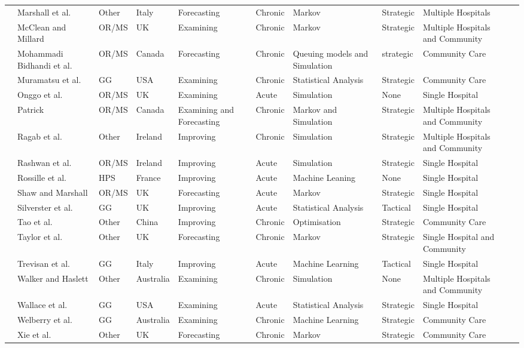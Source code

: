 \documentclass[thesis.tex]{subfiles}
\begin{document}
\begin{landscape}
\begin{table}[]
{\begin{tabular}{@{}llllllllll@{}}
   \cite{Marshall3} &Marshall et al.&Other& Italy &Forecasting&Chronic&Markov&Strategic&Multiple Hospitals\\
  \cite{McClean} &McClean and Millard& OR/MS& UK &Examining&Chronic&Markov&Strategic&Multiple Hospitals and Community\\
\cite{Bidhandi} & Mohammadi Bidhandi et al.&OR/MS&Canada&Forecasting&Chronic&Queuing models and Simulation&strategic&Community Care\\
   \cite{Muramatsu} &Muramatsu et al.&GG&USA& Examining&Chronic&Statistical Analysis&Strategic&Community Care\\
  \cite{Onggo} &Onggo et al.&OR/MS&UK&Examining&Acute&Simulation&None&Single Hospital\\   
  \cite{Patrick}  &Patrick&OR/MS&Canada&Examining and Forecasting&Chronic&Markov and Simulation&Strategic&Multiple Hospitals and Community\\
  \cite{Ragab}  &Ragab et al.& Other&Ireland&Improving&Chronic&Simulation&Strategic&Multiple Hospitals and Community\\
  \cite{Rashwan}  &Rashwan et al.&OR/MS&Ireland&Improving&Acute&Simulation&Strategic&Single Hospital\\
  \cite{Rossille}  &Rossille et al.&HPS &France&Improving&Acute&Machine Leaning&None&Single Hospital\\
  \cite{Shaw} &Shaw and Marshall&OR/MS&UK& Forecasting&Acute&Markov&Strategic&Single Hospital\\
  \cite{Silvester}  &Silverster et al.&GG&UK&Improving&Acute&Statistical Analysis&Tactical&Single Hospital\\
  \cite{Tao}  &Tao et al.& Other&China&Improving&Chronic&Optimisation&Strategic&Community Care\\
  \cite{Taylor}  &Taylor et al.&Other&UK&Forecasting&Chronic&Markov&Strategic&Single Hospital and Community\\
   \cite{Trevisan} &Trevisan et al. &GG&Italy&Improving&Acute&Machine Learning&Tactical&Single Hospital\\
   \cite{Walker} &Walker and Haslett& Other& Australia&Examining&Chronic&Simulation&None&Multiple Hospitals and Community\\
   \cite{Wallace} &Wallace et al.&GG&USA&Examining&Acute&Statistical Analysis&Strategic&Single Hospital\\
  \cite{Welberry}  &Welberry et al.&GG&Australia&Examining&Chronic&Machine Learning&Strategic&Community Care\\
  \cite{Xie}  &Xie et al.&Other&UK &Forecasting&Chronic&Markov&Strategic&Community Care\\

\end{tabular}}
\end{table}
\end{landscape}
\end{document}
